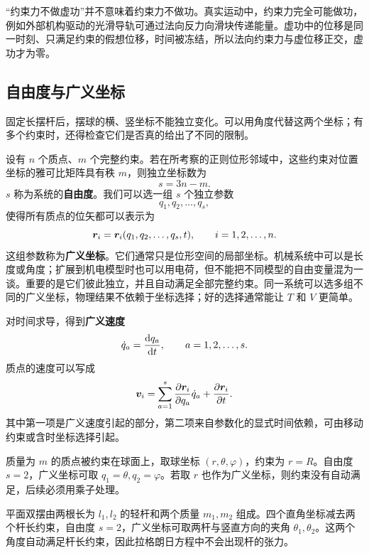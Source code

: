 \begin{physicsbox}
“约束力不做虚功”并不意味着约束力不做功。真实运动中，约束力完全可能做功，例如外部机构驱动的光滑导轨可通过法向反力向滑块传递能量。虚功中的位移是同一时刻、只满足约束的假想位移，时间被冻结，所以法向约束力与虚位移正交，虚功才为零。
\end{physicsbox}

\subsection{自由度与广义坐标}

固定长摆杆后，摆球的横、竖坐标不能独立变化。可以用角度代替这两个坐标；有多个约束时，还得检查它们是否真的给出了不同的限制。

设有 $n$ 个质点、$m$ 个完整约束。若在所考察的正则位形邻域中，这些约束对位置坐标的雅可比矩阵具有秩 $m$，则独立坐标数为
\begin{equation}
s=3n-m.
\label{eq:dof}
\end{equation}
$s$ 称为系统的\textbf{自由度}。我们可以选一组 $s$ 个独立参数
\[
q_1,q_2,\dots,q_s,
\]
使得所有质点的位矢都可以表示为
\begin{equation}
\boldsymbol{r}_i=\boldsymbol{r}_i(q_1,q_2,\dots,q_s,t),
\qquad i=1,2,\dots,n.
\label{eq:generalized-coordinates}
\end{equation}
这组参数称为\textbf{广义坐标}。它们通常只是位形空间的局部坐标。机械系统中可以是长度或角度；扩展到机电模型时也可以用电荷，但不能把不同模型的自由变量混为一谈。重要的是它们彼此独立，并且自动满足全部完整约束。同一系统可以选多组不同的广义坐标，物理结果不依赖于坐标选择；好的选择通常能让 $T$ 和 $V$ 更简单。

对时间求导，得到\textbf{广义速度}
\[
\dot q_a=\frac{\mathrm{d} q_a}{\mathrm{d} t},\qquad a=1,2,\dots,s.
\]
质点的速度可以写成
\begin{equation}
\boldsymbol{v}_i=\sum_{a=1}^{s}\frac{\partial \boldsymbol{r}_i}{\partial q_a}\dot q_a+\frac{\partial \boldsymbol{r}_i}{\partial t}.
\label{eq:velocity-generalized}
\end{equation}
其中第一项是广义速度引起的部分，第二项来自参数化的显式时间依赖，可由移动约束或含时坐标选择引起。

\begin{example}[球坐标与双摆]
质量为 $m$ 的质点被约束在球面上，取球坐标 $(r,\theta,\varphi)$，约束为 $r=R$。自由度 $s=2$，广义坐标可取 $q_1=\theta,q_2=\varphi$。若取 $r$ 也作为广义坐标，则约束没有自动满足，后续必须用乘子处理。

平面双摆由两根长为 $l_1,l_2$ 的轻杆和两个质量 $m_1,m_2$ 组成。四个直角坐标减去两个杆长约束，自由度 $s=2$，广义坐标可取两杆与竖直方向的夹角 $\theta_1,\theta_2$。这两个角度自动满足杆长约束，因此拉格朗日方程中不会出现杆的张力。
\end{example}

